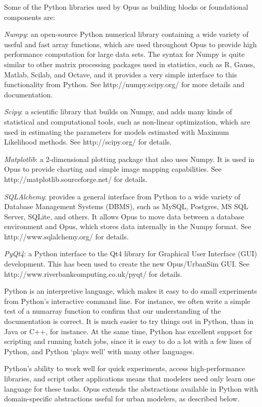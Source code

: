 Some  of the Python libraries used by Opus as building blocks or foundational components are:
\squishlist
\item \emph{Numpy}: an open-source Python numerical library containing a wide variety of useful and fast array functions, which are used throughout Opus to provide high performance computation for large data sets.  The syntax for Numpy is quite similar to other matrix processing packages used in statistics, such as R, Gauss, Matlab, Scilab, and Octave, and it provides a very simple interface to this functionality from Python.  See http://numpy.scipy.org/ for more details and documentation.
\item \emph{Scipy}: a scientific library that builds on Numpy, and adds many kinds of statistical and computational tools, such as non-linear optimization, which are used in estimating the parameters for models estimated with Maximum Likelihood methods.  See http://scipy.org/ for details.
\item \emph{Matplotlib}: a 2-dimensional plotting package that also uses Numpy.  It is used in Opus to provide charting and simple image mapping capabilities.  See http://matplotlib.sourceforge.net/ for details.
\item \emph{SQLAlchemy}: provides a general interface from Python to a wide variety of Database Management Systems (DBMS), such as MySQL, Postgres, MS SQL Server, SQLite, and others.  It allows Opus to move data between a database environment and Opus, which stores data internally in the Numpy format.  See http://www.sqlalchemy.org/ for details.
\item \emph{PyQt4}: a Python interface to the Qt4 library for Graphical User Interface (GUI) development.  This has been used to create the new Opus/UrbanSim GUI.  See http://www.riverbankcomputing.co.uk/pyqt/ for details.
\squishend

Python is an interpretive language, which makes it easy to do small experiments from Python's interactive command line.  For instance, we often write a simple test of a numarray function to confirm that our understanding of the documentation is correct.  It is much easier to try things out in Python, than in Java or C++, for instance.
At the same time, Python has excellent support for scripting and running batch jobs, since it is easy to do a lot with a few lines of Python, and Python `plays well' with many other languages.  

Python's ability to work well for quick experiments, access high-performance libraries, and script other applications means that modelers need only learn one language for these tasks.
Opus extends the abstractions available in Python with domain-specific abstractions useful for urban modelers, as described below.

